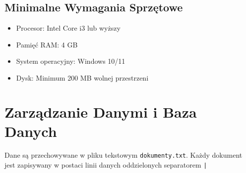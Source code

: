 \subsection{Minimalne Wymagania Sprzętowe}
\begin{itemize}
    \item Procesor: Intel Core i3 lub wyższy
    \item Pamięć RAM: 4 GB
    \item System operacyjny: Windows 10/11
    \item Dysk: Minimum 200 MB wolnej przestrzeni
\end{itemize}

\section{Zarządzanie Danymi i Baza Danych}
Dane są przechowywane w pliku tekstowym \texttt{dokumenty.txt}. Każdy dokument jest zapisywany w postaci linii danych oddzielonych separatorem \texttt{|}






